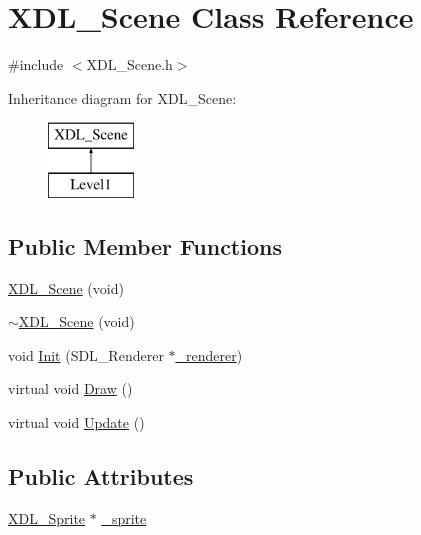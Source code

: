 \hypertarget{class_x_d_l___scene}{\section{X\-D\-L\-\_\-\-Scene Class Reference}
\label{class_x_d_l___scene}
}


{\ttfamily \#include $<$X\-D\-L\-\_\-\-Scene.\-h$>$}

Inheritance diagram for X\-D\-L\-\_\-\-Scene\-:\begin{figure}[H]
\begin{center}
\leavevmode
\includegraphics[height=2.000000cm]{class_x_d_l___scene}
\end{center}
\end{figure}
\subsection*{Public Member Functions}
\begin{DoxyCompactItemize}
\item 
\hyperlink{class_x_d_l___scene_abc2c1afb7ab21c4ca3f5f2146786a1ab}{X\-D\-L\-\_\-\-Scene} (void)
\item 
\hyperlink{class_x_d_l___scene_aa2bd0b3f778c179dc2638674efad4509}{$\sim$\-X\-D\-L\-\_\-\-Scene} (void)
\item 
void \hyperlink{class_x_d_l___scene_a14d2c87c4fc3914182de6ec8bf27cf67}{Init} (S\-D\-L\-\_\-\-Renderer $\ast$\hyperlink{class_x_d_l___scene_a923ee55d91647c14f2566f1aa70e3aed}{\-\_\-renderer})
\item 
virtual void \hyperlink{class_x_d_l___scene_a1a3d1b1f6a4f1f4c0834cc1fe29af814}{Draw} ()
\item 
virtual void \hyperlink{class_x_d_l___scene_abd1ce8f1dbc90c4376c99ccd7fd9c024}{Update} ()
\end{DoxyCompactItemize}
\subsection*{Public Attributes}
\begin{DoxyCompactItemize}
\item 
\hyperlink{class_x_d_l___sprite}{X\-D\-L\-\_\-\-Sprite} $\ast$ \hyperlink{class_x_d_l___scene_a92843792b25864d0aec748ca60213e24}{\-\_\-sprite}
\end{DoxyCompactItemize}
